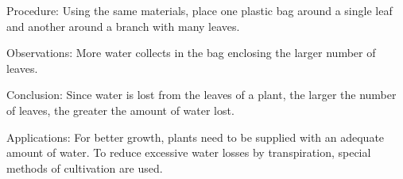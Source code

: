\begin{multicols}{2}
\begin{description*}
\item[Procedure:]{Using the same materials, place one plastic bag around a single leaf and
another around a branch with many leaves.}
\item[Observations:]{More water collects in the bag enclosing the larger number of leaves.}
\item[Conclusion:]{Since water is lost from the leaves of a plant, the larger the number of leaves, the
greater the amount of water lost.}
\item[Applications:]{For better growth, plants need to be supplied with an adequate amount of water.
To reduce excessive water losses by transpiration, special methods of cultivation are used.}
\end{description*}

%
%




\end{multicols}
\vfill
\pagebreak